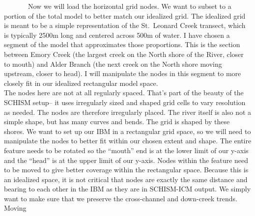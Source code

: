 \documentclass[
]{article}
\begin{document}
~~~~~~~Now we will load the horizontal grid nodes. We want to subset to
a portion of the total model to better match our idealized grid. The
idealized grid is meant to be a simple representation of the St.~Leonard
Creek transect, which is typically 2500m long and centered across 500m
of water. I have chosen a segment of the model that approximates those
proportions. This is the section between Emory Creek (the largest creek
on the North shore of the River, closer to mouth) and Alder Branch (the
next creek on the North shore moving upstream, closer to head). I will
manipulate the nodes in this segment to more closely fit in our
idealized rectangular model space.\\
\hspace*{0.333em}\hspace*{0.333em}\hspace*{0.333em}\hspace*{0.333em}\hspace*{0.333em}\hspace*{0.333em}\hspace*{0.333em}\hspace*{0.333em}\hspace*{0.333em}The
nodes here are not at all regularly spaced. That's part of the beauty of
the SCHISM setup-- it uses irregularly sized and shaped grid cells to
vary resolution as needed. The nodes are therefore irregularly placed.
The river itself is also not a simple shape, but has many curves and
bends. The grid is shaped by these shores. We want to set up our IBM in
a rectangular grid space, so we will need to manipulate the nodes to
better fit within our chosen extent and shape. The entire feature needs
to be rotated so the ``mouth'' end is at the lower limit of our y-axis
and the ``head'' is at the upper limit of our y-axis. Nodes within the
feature need to be moved to give better coverage within the rectangular
space. Because this is an idealized space, it is not critical that nodes
are exactly the same distance and bearing to each other in the IBM as
they are in SCHISM-ICM output. We simply want to make sure that we
preserve the cross-channel and down-creek trends.\\
\hspace*{0.333em}\hspace*{0.333em}\hspace*{0.333em}\hspace*{0.333em}\hspace*{0.333em}\hspace*{0.333em}\hspace*{0.333em}Moving
\end{document}
